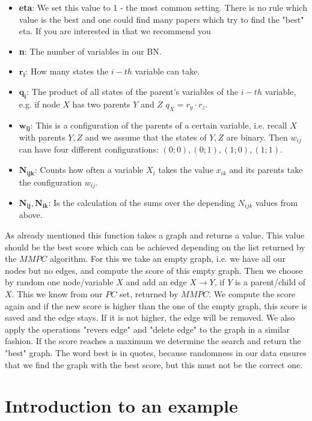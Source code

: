 				\begin{itemize}
					\item \textbf{eta}: We set this value to 1 - the most common setting. There is no rule which value is the best and one could find many papers which try to find the "best" eta. If you are interested in that we recommend you \cite{SKM}
					\item \textbf{n}: The number of variables in our BN.
					\item $\boldsymbol{r_{i}}$: How many states the $i-th$ variable can take.
					\item $\boldsymbol{q_{i}}$: The product of all states of the parent's variables of the $i-th$ variable, e.g. if node $X$ has two parents $Y$ and $Z$ $q_{X} = r_{y} \cdot r_{z}$.
					\item $\boldsymbol{w_{ij}}$: This is a configuration of the parents of a certain variable, i.e. recall $X$ with parents $Y, Z$ and we assume that the states of $Y, Z$ are binary. Then $w_{ij}$ can have four different configurations: $(0; 0), (0; 1), (1; 0), (1; 1)$.
					\item $\boldsymbol{N_{ijk}}$: Counts how often a variable $X_{i}$ takes the value $x_{ik}$ and its parents take the configuration $w_{ij}$.
					\item $\boldsymbol{N_{ij}, N_{ik}}$: Is the calculation of the sums over the depending $N_{ijk}$ values from above.
				\end{itemize}

			As already mentioned this function takes a graph and returns a value. This value should be the best score which can be achieved depending on the list returned by the $MMPC$ algorithm. For this we take an empty graph, i.e. we have all our nodes but no edges, and compute the score of this empty graph. Then we choose by random one node/variable $X$ and add an edge $X \longrightarrow Y$, if $Y$ is a parent/child of $X$. This we know from our $PC$ set, returned by $MMPC$. We compute the score again and if the new score is higher than the one of the empty graph, this score is saved and the edge stays. If it is not higher, the edge will be removed. We also apply the operations "revers edge" and "delete edge" to the graph in a similar fashion. If the score reaches a maximum we determine the search and return the "best" graph. The word best is in quotes, because randomness in our data ensures that we find the graph with the best score, but this must not be the correct one.

	\section{Introduction to an example}

